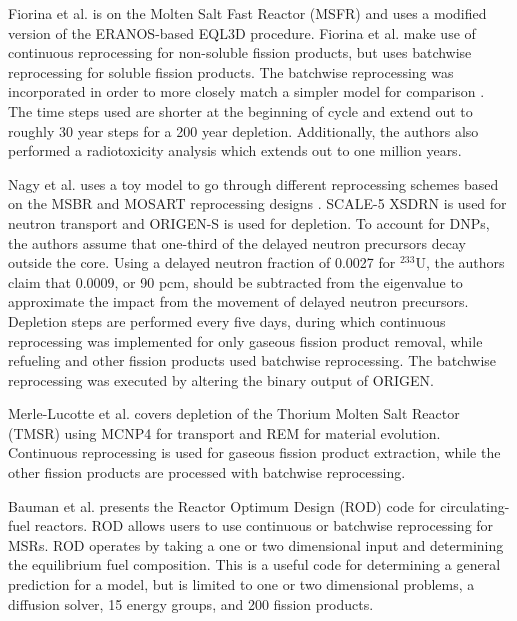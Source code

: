 Fiorina et al. \cite{fiorina_preliminary_2012} is on the Molten Salt Fast Reactor (MSFR) and uses a modified version of the ERANOS-based EQL3D procedure. Fiorina et al. make use of continuous reprocessing for non-soluble fission products, but uses batchwise reprocessing for soluble fission products.
The batchwise reprocessing was incorporated in order to more closely match a simpler model for comparison \cite{merle-lucotte_launching_2011}. The time steps used are shorter at the beginning of cycle and extend out to roughly 30 year steps for a 200 year depletion. Additionally, the authors also performed a radiotoxicity analysis which extends out to one million years.

Nagy et al. \cite{nagy_parametric_2008} uses a toy model to go through different reprocessing schemes based on the MSBR and MOSART reprocessing designs \cite{robertson_conceptual_1971, ignatiev_progress_2007}. SCALE-5 XSDRN\cite{noauthor_scale_2005} is used for neutron transport and ORIGEN-S is used for depletion. To account for DNPs, the authors assume that one-third of the delayed neutron precursors decay outside the core.
Using a delayed neutron fraction of 0.0027 for $^{233}$U, the authors claim that 0.0009, or 90 pcm, should be subtracted from the eigenvalue to approximate the impact from the movement of delayed neutron precursors.
Depletion steps are performed every five days, during which continuous reprocessing was implemented for only gaseous fission product removal, while refueling and other fission products used batchwise reprocessing.
The batchwise reprocessing was executed by altering the binary output of ORIGEN.

Merle-Lucotte et al. \cite{merle-lucotte_thorium_2007} covers depletion of the Thorium Molten Salt Reactor (TMSR) using MCNP4 \cite{goluoglu_software_1998} for transport and REM for material evolution. Continuous reprocessing is used for gaseous fission product extraction, while the other fission products are processed with batchwise reprocessing.

Bauman et al. \cite{h_f_bauman_rod_1971} presents the Reactor Optimum Design (ROD) code for circulating-fuel reactors. 
ROD allows users to use continuous or batchwise reprocessing for MSRs. ROD operates by taking a one or two dimensional input and determining the equilibrium fuel composition. This is a useful code for determining a general prediction for a model, but is limited to one or two dimensional problems, a diffusion solver, 15 energy groups, and 200 fission products.

